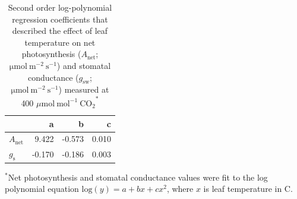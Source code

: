 \newpage
\begin{table}[]
    \centering
    \caption[Second order log-polynomial regression coefficients that described the effect of leaf temperature on net photosynthesis and stomatal conductance measured at 400 $\mu \mathrm{mol\ mol^{-1}\ CO_2}$]{Second order log-polynomial regression coefficients that described the effect of leaf temperature on net photosynthesis ($A_\mathrm{net}$; $\mathrm{\mu mol\ m^{-2}\ s^{-1}}$) and stomatal conductance ($g_\mathrm{sw}$; $\mathrm{\mu mol\ m^{-2}\ s^{-1}}$) measured at 400 $\mu \mathrm{mol\ mol^{-1}\ CO_2}^*$}
    \label{table:tab.b3}
    \begin{tabular}{p{2cm}p{3cm}p{3cm}p{}}  
        \hline
                            & \multicolumn{1}{r}{a}      & \multicolumn{1}{r}{b}      & \multicolumn{1}{r}{c}     \\
        \hline
        $A_\mathrm{net}$    & \multicolumn{1}{r}{9.422}  & \multicolumn{1}{r}{-0.573} & \multicolumn{1}{r}{0.010} \\
        $g_\mathrm{s}$      & \multicolumn{1}{r}{-0.170} & \multicolumn{1}{r}{-0.186} & \multicolumn{1}{r}{0.003}
\end{tabular}%
\end{table}
\begin{singlespace}
    \noindent $^*$Net photosynthesis and stomatal conductance values were fit to the log polynomial equation $\mathrm{log}(y)= a + bx + cx^2$, where $x$ is leaf temperature in \textdegree{}C.
\end{singlespace}
\clearpage

